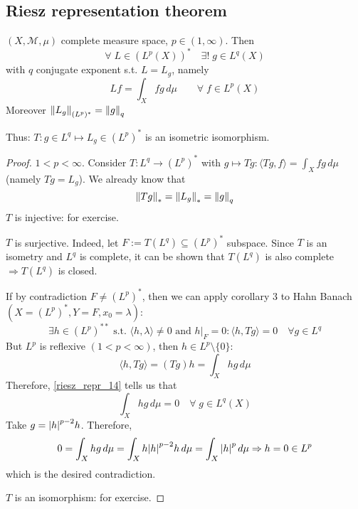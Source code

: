 \subsection{Riesz representation theorem}

\begin{theorem}
    \((X, \mathcal{M}, \mu)\) complete measure space, \(p \in (1, \infty)\). Then 
    \[
        \forall\; L \in (L^p(X))^* \quad \exists! \; g \in L^{{q}}(X)
    \]
    with \({q} \) conjugate exponent s.t. \(L=L_g\), namely
    \[
        Lf = \int_X fg \, d\mu \qquad \forall\; f \in L^p(X)
    \]
    Moreover \(\norm{L_g}_{(L^p)^*} = \norm{g}_{{q}}\)
    
    Thus: \(T: g \in L^{{q}} \mapsto L_g \in (L^p)^*\) is an isometric isomorphism.
\end{theorem}
\begin{proof}
    \(1 < p < \infty\). Consider \(T: L^{{q}} \to (L^p)^*\) with \(g \mapsto Tg: \langle Tg, f \rangle = \int_X fg \, d\mu\) (namely \(Tg = L_g\)). We already know that
    \[
        \norm{Tg}_* = \norm{L_g}_* = \norm{g}_{{q}}
    \]
    \(T\) is injective: for exercise.

    \(T\) is surjective. Indeed, let \(F:= T(L^{{q}}) \subseteq (L^p)^*\) subspace. Since \(T\) is an isometry and \(L^{{q}}\) is complete, it can be shown that \(T(L^{{q}})\) is also complete \(\Rightarrow T(L^{{q}})\) is closed.

    If by contradiction \(F \neq (L^p)^*\), then we can apply corollary 3 to Hahn Banach \((X = (L^p)^*, Y=F, x_0 = \lambda)\):
        \begin{equation}\label{riesz_repr_14}
            \exists h \in (L^p)^{**} \text{ s.t. } \langle h, \lambda \rangle \neq 0 \text{ and } h|_F = 0: \langle h, Tg \rangle =0 \quad \forall g \in L^{{q}} \tag{1}
        \end{equation} 
    But \(L^p \) is reflexive \((1 <p < \infty)\), then \(h \in L^p \setminus \{0\}\):
    \[
        \langle h, Tg \rangle = (Tg)h = \int_X hg \, d\mu
    \]
    Therefore, \eqref{riesz_repr_14} tells us that
    \[
        \int_X hg \, d\mu =0 \quad \forall \; g \in L^{{q}}(X)
    \]
    Take \(g = \abs{h}^{p-2}h\). Therefore,
    \[
        0 = \int_X hg \, d\mu = \int_X h \abs{h}^{p-2} h \, d\mu = \int_X \abs{h}^p \, d\mu \Rightarrow h=0 \in L^p
    \]
    which is the desired contradiction.

    \(T\) is an isomorphism: for exercise.
\end{proof}

